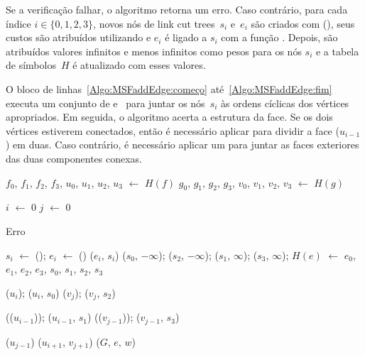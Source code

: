 Se a verificação falhar, o algoritmo retorna um erro. Caso contrário, para cada índice $i \in \{0, 1, 2, 3\}$, novos nós de link cut trees~$s_i$ e~$e_i$ são criados com \LCOMakeNode(), seus custos são atribuídos utilizando \LCOAddCost{} e $e_i$ é ligado a $s_i$ com a função \linkcutAddEdge{}.
Depois, são atribuídos valores infinitos e menos infinitos como pesos para os nós $s_i$ e a tabela de símbolos~$H$ é atualizado com esses valores.

O bloco de linhas~\ref{Algo:MSFaddEdge:começo} até~\ref{Algo:MSFaddEdge:fim} executa um conjunto de \LCOCycle{} e~\LCOMerge{} para juntar os nós~$s_i$ às ordens cíclicas dos vértices apropriados.  
Em seguida, o algoritmo acerta a estrutura da face.
Se os dois vértices estiverem conectados, então é necessário aplicar \LCOSplit{} para dividir a face \LCOFindNode($u_{i-1}$) em duas.
Caso contrário, é necessário aplicar um \LCOMerge para juntar as faces exteriores das duas componentes conexas.

\begin{algorithm}[htb]
\caption{\MSFaddEdge($G$, $e$, $u$, $f$, $v$, $g$, $w$)}
\label{Algo:MSFaddEdge}
\begin{algorithmic}[1]

\State $f_0$, $f_1$, $f_2$, $f_3$, $u_0$, $u_1$, $u_2$, $u_3$ $\gets$ $H(f)$
\State $g_0$, $g_1$, $g_2$, $g_3$, $v_0$, $v_1$, $v_2$, $v_3$ $\gets$ $H(g)$

 $i$ $\gets$ $0$
\EndIf
{} $j$ $\gets$ $0$
\EndIf

\label{Algo:MSFaddEdge:linhaSe}
\State \Return Erro
\EndIf

\State $s_i$ $\gets$ \LCOMakeNode(); $e_i$ $\gets$ \LCOMakeNode()
\State \linkcutAddEdge($e_i$, $s_i$)
\EndFor
\State \LCOAddCost($s_0$, $-\infty$); \LCOAddCost($s_2$, $-\infty$);
\State \LCOAddCost($s_1$, $\infty$); \LCOAddCost($s_3$, $\infty$);
\State $H(e)$ $\gets$ $e_0$, $e_1$, $e_2$, $e_3$, $s_0$, $s_1$, $s_2$, $s_3$

\State \LCOCycle($u_i$); \LCOMerge($u_i$, $s_0$)\label{Algo:MSFaddEdge:começo}
\State \LCOCycle($v_j$); \LCOMerge($v_j$, $s_2$)


\State \LCOCycle(\treapPredecessor($u_{i-1}$)); \LCOMerge($u_{i-1}$, $s_1$)
\State \LCOCycle(\treapPredecessor($v_{j-1}$)); \LCOMerge($v_{j-1}$, $s_3$)\label{Algo:MSFaddEdge:fim}


\State \LCOSplit($u_{j-1}$)
\Else
\State \LCOMerge($u_{i+1}$, $v_{j+1}$)
\EndIf
\State \MSFupdate($G$, $e$, $w$)
\end{algorithmic}
\end{algorithm}

